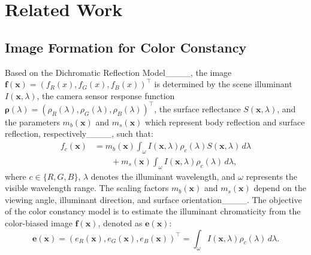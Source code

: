 \section{Related Work}
\label{sec2}
\subsection{Image Formation for Color Constancy} \label{sec2.1}
\par Based on the Dichromatic Reflection Model____, the image $\boldsymbol{f}(\boldsymbol{x}) = \left( f_R(x), f_G(x), f_B(x) \right)^\top$ is determined by the scene illuminant $I(\boldsymbol{x}, \lambda)$, the camera sensor response function $\boldsymbol{\rho}(\lambda) = \left( \rho_R(\lambda), \rho_G(\lambda), \rho_B(\lambda) \right)^\top$, the surface reflectance $S(\boldsymbol{x}, \lambda)$, and the parameters $m_b(\boldsymbol{x})$ and $m_s(\boldsymbol{x})$ which represent body reflection and surface reflection, respectively____, such that:
\begin{equation} \label{eq1}
\begin{aligned}
  f_c(\boldsymbol{x}) &= m_b(\boldsymbol{x}) \int_\omega I(\boldsymbol{x}, \lambda) \rho_c(\lambda) S(\boldsymbol{x}, \lambda) \, d\lambda \\
  &\quad\quad + m_s(\boldsymbol{x}) \int_\omega I(\boldsymbol{x}, \lambda) \rho_c(\lambda) \, d\lambda,
\end{aligned}
\end{equation}
where $c \in \{R, G, B\}$, $\lambda$ denotes the illuminant wavelength, and $\omega$ represents the visible wavelength range. The scaling factors $m_b(\boldsymbol{x})$ and $m_s(\boldsymbol{x})$ depend on the viewing angle, illuminant direction, and surface orientation____. 
The objective of the color constancy model is to estimate the illuminant chromaticity from the color-biased image $\boldsymbol{f}(\boldsymbol{x})$, denoted as $\boldsymbol{e}(\boldsymbol{x})$:
\begin{equation} \label{eq2}
\boldsymbol{e}(\boldsymbol{x}) = \left(e_R(\boldsymbol{x}), e_G(\boldsymbol{x}), e_B(\boldsymbol{x})\right)^\top = \int_\omega I(\boldsymbol{x}, \lambda) \rho_c(\lambda) \, d\lambda.
\end{equation}

